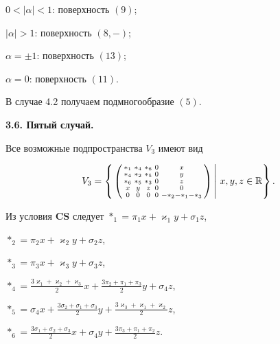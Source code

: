 $0<|\alpha|<1$: поверхность $(9)$;





$|\alpha|>1$: поверхность $(8,-)$;





$\alpha=\pm1$: поверхность $(13)$;





$\alpha=0$: поверхность $(11)$.





В случае 4.2 получаем подмногообразие $(5)$.


\medskip





{\bf 3.6. Пятый случай.}


Все возможные подпространства $V_3$ имеют вид


$$


V_3=\left\{\left.


\left(\begin{smallmatrix}


{}*_1&{}*_4&{}*_6&0&x \\ {}*_4&{}*_2&{}*_5&0&y\\ {}*_6 &{}*_5&{}*_3&0&z \\


x&y&z&0&0\\ 0&0&0&0&-{}*_2-{}*_1-{}*_3


\end{smallmatrix}\right)\,\right|\,x,y,z\in\Bbb R\right\}.


$$





Из условия {\bf CS} следует ${}*_1=\pi_1 x+\varkappa_1 y+\sigma_1 z$,


${}*_2=\pi_2 x+\varkappa_2 y+\sigma_2 z$,


${}*_3=\pi_3 x+\varkappa_3 y+\sigma_3 z$,


${}*_4=\frac{3\varkappa_1+\varkappa_2+\varkappa_3}2


x+\frac{3\pi_2+\pi_1+\pi_3}2 y+\sigma_4 z$,


${}*_5=\sigma_4 x+\frac{3\sigma_2+\sigma_1+\sigma_3}2


y+\frac{3\varkappa_3+\varkappa_1+\varkappa_2}2 z$,


${}*_6=\frac{3\sigma_1+\sigma_2+\sigma_3}2 x+\sigma_4


y+\frac{3\pi_3+\pi_1+\pi_2}2 z$.





